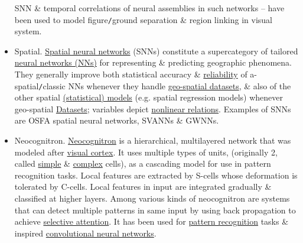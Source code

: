\documentclass{article}
\begin{document}
\begin{itemize}
	SNN \& temporal correlations of neural assemblies in such networks -- have been used to model figure{\tt/}ground separation \& region linking in visual system.
	\item {\sf Spatial.} \href{https://en.wikipedia.org/wiki/Spatial_neural_network}{Spatial neural networks} (SNNs) constitute a supercategory of tailored \href{https://en.wikipedia.org/wiki/Artificial_neural_networks}{neural networks (NNs)} for representing \& predicting geographic phenomena. They generally improve both statistical accuracy \& \href{https://en.wikipedia.org/wiki/Statistical_reliability}{reliability} of a-spatial{\tt/}classic NNs whenever they handle \href{https://en.wikipedia.org/wiki/Geographic_data_and_information}{geo-spatial datasets}, \& also of the other spatial \href{https://en.wikipedia.org/wiki/Statistical_model}{(statistical) models} (e.g. spatial regression models) whenever geo-spatial \href{https://en.wikipedia.org/wiki/Data_set}{Datasets}; variables depict \href{https://en.wikipedia.org/wiki/Nonlinear_system}{nonlinear relations}. Examples of SNNs are OSFA spatial neural networks, SVANNs \& GWNNs.
	\item {\sf Neocognitron.} \href{https://en.wikipedia.org/wiki/Neocognitron}{Neocognitron} is a hierarchical, multilayered network that was modeled after \href{https://en.wikipedia.org/wiki/Visual_cortex}{visual cortex}. It uses multiple types of units, (originally 2, called \href{https://en.wikipedia.org/wiki/Simple_cell}{simple} \& \href{https://en.wikipedia.org/wiki/Complex_cell}{complex} cells), as a cascading model for use in pattern recognition tasks. Local features are extracted by S-cells whose deformation is tolerated by C-cells. Local features in input are integrated gradually \& classified at higher layers. Among various kinds of neocognitron are systems that can detect multiple patterns in same input by using back propagation to achieve \href{https://en.wikipedia.org/wiki/Selective_attention}{selective attention}. It has been used for \href{https://en.wikipedia.org/wiki/Pattern_recognition}{pattern recognition} tasks \& inspired \href{https://en.wikipedia.org/wiki/Convolutional_neural_network}{convolutional neural networks}.

\end{itemize}
\end{document}
